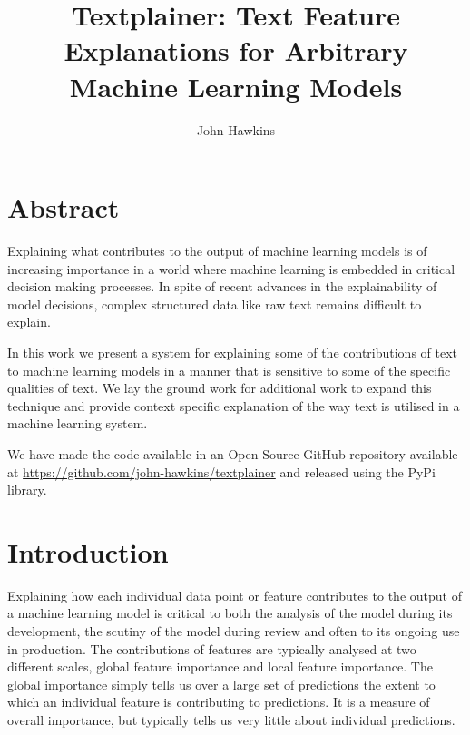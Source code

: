 \documentclass[12pt,a4paper]{article}
\numberwithin{equation}{section}
\begin{document}
 
\title{Textplainer: Text Feature Explanations for Arbitrary Machine Learning Models}

\author{John Hawkins} 

\maketitle

\section{Abstract}

Explaining what contributes to the output of machine learning models is of increasing importance in
a world where machine learning is embedded in critical decision making processes. In spite of recent advances in
the explainability of model decisions, complex structured data like raw text remains difficult to explain.

In this work we present a system for explaining some of the contributions of text to machine learning models
in a manner that is sensitive to some of the specific qualities of text. We lay the ground work for additional
work to expand this technique and provide context specific explanation of the way text is utilised in a machine
learning system.

We have made the code available in an Open Source GitHub repository 
available at \href{https://github.com/john-hawkins/textplainer}{https://github.com/john-hawkins/textplainer}
and released using the PyPi library. 


\section{Introduction}

Explaining how each individual data point or feature contributes to the output of a machine learning model is 
critical to both the analysis of the model during its development, the scutiny of the model during review and 
often to its ongoing use in production. The contributions of features are typically analysed at two different
scales, global feature importance and local feature importance. The global importance simply tells us over a large 
set of predictions the extent to which an individual feature is contributing to predictions. It is a measure of overall
importance, but typically tells us very little about individual predictions.
\end{document}
